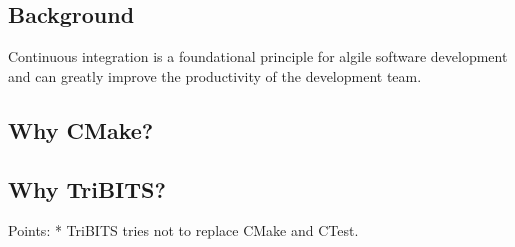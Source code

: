 \documentclass[10pt]{article}
\begin{document}
%
\subsection{Background}
%

Continuous integration \cite{ContinuousIntegration07} is a foundational principle for algile software development and can greatly improve the productivity of the development team.

%
\subsection{Why CMake?}
%

%
\subsection{\large Why TriBITS?}
%

Points:
* TriBITS tries not to replace CMake and CTest.







\end{document}
